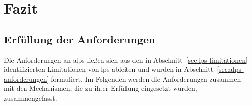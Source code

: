\chapter{Fazit}
\label{ch:fazit}

\section{Erfüllung der Anforderungen}
\label{sec:fazit-anforderungen}

Die Anforderungen an \gls{alps} ließen sich aus den in Abschnitt~\ref{sec:lps-limitationen} identifizierten Limitationen von \gls{lps} ableiten und wurden in Abschnitt~\ref{sec:alps-anforderungen} formuliert. Im Folgenden werden die Anforderungen zusammen mit den Mechanismen, die zu ihrer Erfüllung eingesetzt wurden, zusammengefasst.

